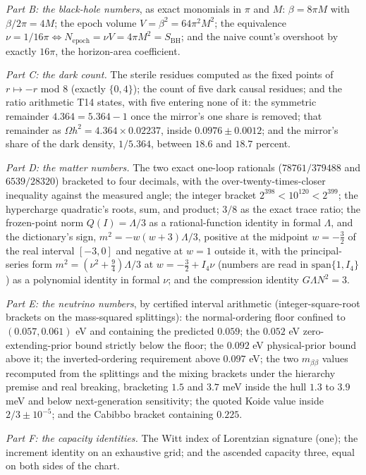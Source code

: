\documentclass[11pt]{article}
\theoremstyle{definition}
\theoremstyle{plain}
\begin{document}
\emph{Part B: the black-hole numbers}, as exact monomials in $\pi$ and $M$: $\beta = 8\pi M$ with $\beta/2\pi = 4M$; the epoch volume $V = \beta^{2} = 64\pi^{2}M^{2}$; the equivalence $\nu = 1/16\pi \iff N_{\mathrm{epoch}} = \nu V = 4\pi M^{2} = S_{\mathrm{BH}}$; and the naive count's overshoot by exactly $16\pi$, the horizon-area coefficient.

\emph{Part C: the dark count.} The sterile residues computed as the fixed points of $r \mapsto -r$ mod 8 (exactly $\{0, 4\}$); the count of five dark causal residues; and the ratio arithmetic T14 states, with five entering none of it: the symmetric remainder $4.364 = 5.364 - 1$ once the mirror's one share is removed; that remainder as $\Omega h^{2} = 4.364 \times 0.02237$, inside $0.0976 \pm 0.0012$; and the mirror's share of the dark density, $1/5.364$, between $18.6$ and $18.7$ percent.

\emph{Part D: the matter numbers.} The two exact one-loop rationals ($78761/379488$ and $6539/28320$) bracketed to four decimals, with the over-twenty-times-closer inequality against the measured angle; the integer bracket $2^{398} < 10^{120} < 2^{399}$; the hypercharge quadratic's roots, sum, and product; $3/8$ as the exact trace ratio; the frozen-point norm $Q(I) = \Lambda/3$ as a rational-function identity in formal $\Lambda$, and the dictionary's sign, $m^{2} = -w(w+3)\Lambda/3$, positive at the midpoint $w = -\tfrac32$ of the real interval $[-3, 0]$ and negative at $w = 1$ outside it, with the principal-series form $m^{2} = (\nu^{2} + \tfrac94)\Lambda/3$ at $w = -\tfrac32 + I_4\nu$ (numbers are read in $\mathrm{span}\{1, I_4\}$) as a polynomial identity in formal $\nu$; and the compression identity $G\Lambda N^{2} = 3$.

\emph{Part E: the neutrino numbers}, by certified interval arithmetic (integer-square-root brackets on the mass-squared splittings): the normal-ordering floor confined to $(0.057, 0.061)$ eV and containing the predicted $0.059$; the $0.052$ eV zero-extending-prior bound strictly below the floor; the $0.092$ eV physical-prior bound above it; the inverted-ordering requirement above $0.097$ eV; the two $m_{\beta\beta}$ values recomputed from the splittings and the mixing brackets under the hierarchy premise and real breaking, bracketing $1.5$ and $3.7$ meV inside the hull $1.3$ to $3.9$ meV and below next-generation sensitivity; the quoted Koide value inside $2/3 \pm 10^{-5}$; and the Cabibbo bracket containing $0.225$.

\emph{Part F: the capacity identities.} The Witt index of Lorentzian signature (one); the increment identity on an exhaustive grid; and the ascended capacity three, equal on both sides of the chart.
\end{document}
